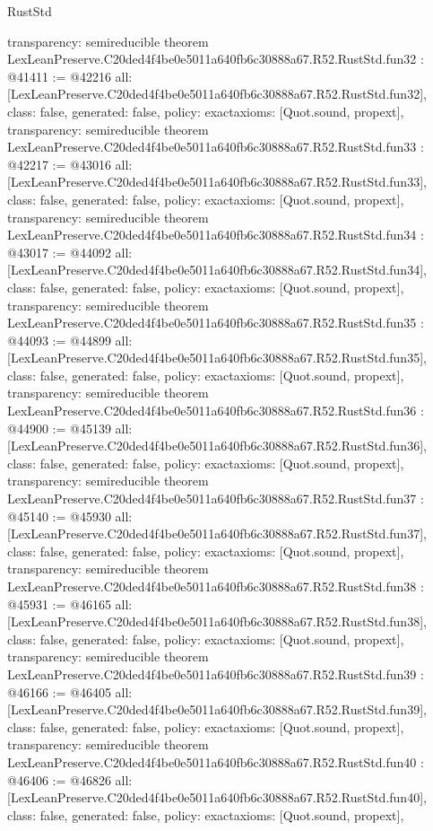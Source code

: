 \begin{lexlean}{RustStd}
\begin{coremodule}
{  transparency: semireducible
}
theorem LexLeanPreserve.C20ded4f4be0e5011a640fb6c30888a67.R52.RustStd.fun32 : @41411 := @42216 {
  all: [LexLeanPreserve.C20ded4f4be0e5011a640fb6c30888a67.R52.RustStd.fun32],
  class: false,
  generated: false,
  policy: exact{axioms: [Quot.sound, propext]},
  transparency: semireducible
}
theorem LexLeanPreserve.C20ded4f4be0e5011a640fb6c30888a67.R52.RustStd.fun33 : @42217 := @43016 {
  all: [LexLeanPreserve.C20ded4f4be0e5011a640fb6c30888a67.R52.RustStd.fun33],
  class: false,
  generated: false,
  policy: exact{axioms: [Quot.sound, propext]},
  transparency: semireducible
}
theorem LexLeanPreserve.C20ded4f4be0e5011a640fb6c30888a67.R52.RustStd.fun34 : @43017 := @44092 {
  all: [LexLeanPreserve.C20ded4f4be0e5011a640fb6c30888a67.R52.RustStd.fun34],
  class: false,
  generated: false,
  policy: exact{axioms: [Quot.sound, propext]},
  transparency: semireducible
}
theorem LexLeanPreserve.C20ded4f4be0e5011a640fb6c30888a67.R52.RustStd.fun35 : @44093 := @44899 {
  all: [LexLeanPreserve.C20ded4f4be0e5011a640fb6c30888a67.R52.RustStd.fun35],
  class: false,
  generated: false,
  policy: exact{axioms: [Quot.sound, propext]},
  transparency: semireducible
}
theorem LexLeanPreserve.C20ded4f4be0e5011a640fb6c30888a67.R52.RustStd.fun36 : @44900 := @45139 {
  all: [LexLeanPreserve.C20ded4f4be0e5011a640fb6c30888a67.R52.RustStd.fun36],
  class: false,
  generated: false,
  policy: exact{axioms: [Quot.sound, propext]},
  transparency: semireducible
}
theorem LexLeanPreserve.C20ded4f4be0e5011a640fb6c30888a67.R52.RustStd.fun37 : @45140 := @45930 {
  all: [LexLeanPreserve.C20ded4f4be0e5011a640fb6c30888a67.R52.RustStd.fun37],
  class: false,
  generated: false,
  policy: exact{axioms: [Quot.sound, propext]},
  transparency: semireducible
}
theorem LexLeanPreserve.C20ded4f4be0e5011a640fb6c30888a67.R52.RustStd.fun38 : @45931 := @46165 {
  all: [LexLeanPreserve.C20ded4f4be0e5011a640fb6c30888a67.R52.RustStd.fun38],
  class: false,
  generated: false,
  policy: exact{axioms: [Quot.sound, propext]},
  transparency: semireducible
}
theorem LexLeanPreserve.C20ded4f4be0e5011a640fb6c30888a67.R52.RustStd.fun39 : @46166 := @46405 {
  all: [LexLeanPreserve.C20ded4f4be0e5011a640fb6c30888a67.R52.RustStd.fun39],
  class: false,
  generated: false,
  policy: exact{axioms: [Quot.sound, propext]},
  transparency: semireducible
}
theorem LexLeanPreserve.C20ded4f4be0e5011a640fb6c30888a67.R52.RustStd.fun40 : @46406 := @46826 {
  all: [LexLeanPreserve.C20ded4f4be0e5011a640fb6c30888a67.R52.RustStd.fun40],
  class: false,
  generated: false,
  policy: exact{axioms: [Quot.sound, propext]},
}
\end{coremodule}
\end{lexlean}
